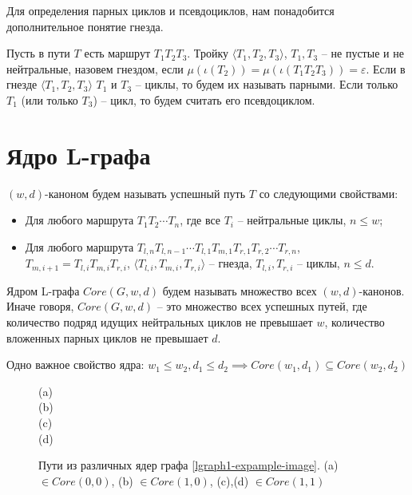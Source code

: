 Для определения парных циклов и псевдоциклов, нам понадобится дополнительное понятие гнезда.

Пусть в пути $T$ есть маршрут $T_1 T_2 T_3$. 
Тройку $\langle T_1, T_2, T_3 \rangle$, $T_1, T_3$ -- не пустые и не нейтральные, назовем гнездом, 
если $\mu(\iota(T_2)) = \mu(\iota(T_1 T_2 T_3)) = \varepsilon$.
Если в гнезде $\langle T_1, T_2, T_3 \rangle$ $T_1$ и $T_3$ -- циклы, то будем их называть парными.
Если только $T_1$ (или только $T_3$) -- цикл, то будем считать его псевдоциклом.

\section{Ядро L-графа}

$(w,d)$-каноном будем называть успешный путь $T$ со следующими свойствами:
\begin{itemize}
    \item Для любого маршрута $T_1 T_2 \cdots T_n$, где все $T_i$ -- нейтральные циклы, $n \leq w$;
    \item Для любого маршрута $T_{l,n} T_{l,n-1} \cdots T_{l,1} T_{m,1} T_{r,1} T_{r,2} \cdots T_{r,n}$,\\
       $T_{m,i+1} = T_{l,i} T_{m,i} T_{r,i}$, $\langle T_{l,i}, T_{m,i}, T_{r,i} \rangle$ -- гнезда, $T_{l,i}, T_{r,i}$ -- циклы,
       $n \leq d$.
\end{itemize}

Ядром L-графа $Core(G, w, d)$ будем называть множество всех $(w,d)$-канонов. 
Иначе говоря, $Core(G, w, d)$ -- это множество всех успешных путей, 
где количество подряд идущих нейтральных циклов не превышает  $w$, 
количество вложенных парных циклов не превышает $d$.  

Одно важное свойство ядра: $w_1 \leq w_2, d_1 \leq d_2 \implies Core(w_1, d_1) \subseteq Core(w_2, d_2)$

\begin{figure}[h]
    \centering
     (a)\\
     (b)\\
     (c)\\
     (d)\\
    
    \caption{Пути из различных ядер графа \ref{lgraph1-expample-image}. (a) $\in Core(0,0)$, (b) $\in Core(1,0)$, (c),(d) $\in Core(1,1)$}
    \label{lgraph1-core-example}
\end{figure}


\clearpage